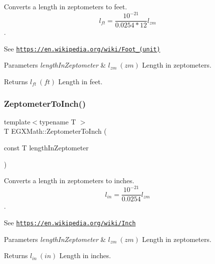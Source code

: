 Converts a length in zeptometers to feet. \[ l_{ft}= \frac{10^{-21}}{0.0254 * 12} l_{zm} \]. 

See \href{https://en.wikipedia.org/wiki/Foot_(unit)}{\tt https\+://en.\+wikipedia.\+org/wiki/\+Foot\+\_\+(unit)} 
\begin{DoxyParams}{Parameters}
{\em length\+In\+Zeptometer} & $ l_{zm}\ (zm)$ Length in zeptometers. \\
\hline
\end{DoxyParams}
\begin{DoxyReturn}{Returns}
$ l_{ft}\ (ft)$ Length in feet. 
\end{DoxyReturn}
\mbox{\label{group___e_g_x_math-_conversions-_length_conversions-_zeptometer-_imperial_ga6bd6b3ee6932c6aa40442a9bff2580cb}} 
\subsubsection{\texorpdfstring{Zeptometer\+To\+Inch()}{ZeptometerToInch()}}
{\footnotesize\ttfamily template$<$typename T $>$ \\
T E\+G\+X\+Math\+::\+Zeptometer\+To\+Inch (\begin{DoxyParamCaption}\item[{const T}]{length\+In\+Zeptometer }\end{DoxyParamCaption})}



Converts a length in zeptometers to inches. \[ l_{in}= \frac{10^{-21}}{0.0254} l_{zm} \]. 

See \href{https://en.wikipedia.org/wiki/Inch}{\tt https\+://en.\+wikipedia.\+org/wiki/\+Inch} 
\begin{DoxyParams}{Parameters}
{\em length\+In\+Zeptometer} & $ l_{zm}\ (zm)$ Length in zeptometers. \\
\hline
\end{DoxyParams}
\begin{DoxyReturn}{Returns}
$ l_{in}\ (in)$ Length in inches. 
\end{DoxyReturn}
\mbox{\label{group___e_g_x_math-_conversions-_length_conversions-_zeptometer-_imperial_ga68abfac4247069bdffc24002b0636495}} 
